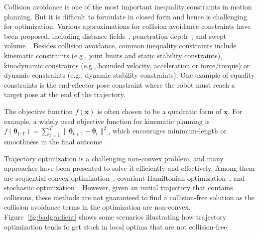 \documentclass[letterpaper, 10 pt, conference]{ieeeconf}  %
\newcommand{\x}{\mbox{$\mathbf x$}}
\newcommand{\btheta}{\mbox{$\bm \theta$}}
\begin{document}
Collision avoidance is one of the most important inequality constraints in motion planning. But it is difficult to formulate in closed form and hence is challenging for optimization. Various approximations for collision avoidance constraints have been proposed, including distance fields~\cite{Khatib:1985:ROA, Ratliff:2009:CGO}, penetration depth~\cite{Cameron:1997:CMP}, and swept volume~\cite{Schulman:2013:FLO}. Besides collision avoidance, common inequality constraints include kinematic constraints (e.g., joint limits and static stability constraints), kinodynamic constraints (e.g., bounded velocity, acceleration or force/torque) or dynamic constraints (e.g., dynamic stability constraints). One example of equality constraints is the end-effector pose constraint where the robot must reach a target pose at the end of the trajectory.

The objective function $f(\x)$ is often chosen to be a quadratic form of $\x$. For example, a widely used objective function for kinematic planning is $f(\btheta_{1:T}) = \sum_{t=1}^T \|\btheta_{t+1} - \btheta_{t}\|^2$, which encourages minimum-length or smoothness in the final outcome~\cite{Schulman:2013:FLO,Ratliff:2009:CGO}.

Trajectory optimization is a challenging non-convex problem, and many approaches have been presented to solve it efficiently and effectively. Among them are sequential convex optimization~\cite{Schulman:2013:FLO}, covariant Hamiltonian optimization~\cite{Ratliff:2009:CGO}, and stochastic optimization~\cite{Kalakrishnan:2011:STOMP}. However, given an initial trajectory that contains collisions, these methods are not guaranteed to find a collision-free solution as the collision avoidance terms in the optimization are non-convex. Figure~\ref{fig:badgradient} shows some scenarios illustrating how trajectory optimization tends to get stuck in local optima that are not collision-free. 
\end{document}

